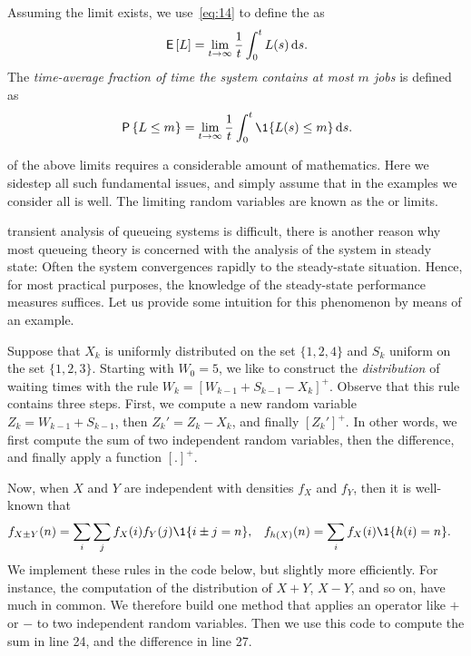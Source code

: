 Assuming the limit exists, we use~\cref{eq:14} to define the  as
\begin{equation} \label{eq:46}
 \,\mathsf{E}\left[L\right] = \lim_{t\to\infty} \frac 1 t\int_0^t L(s) \,\textrm{d}s.
\end{equation}
 The \emph{time-average fraction of time the system contains at most $m$ jobs} is defined as
\begin{equation*}
 \P{\L\leq m} =\lim_{t\to\infty} \frac 1 t\int_0^t \1{\L(s)\leq m} \d s.
\end{equation*}

 of the above limits requires a considerable amount of mathematics.
Here we sidestep all such fundamental issues, and simply assume that in the examples we consider all is well.
The limiting random variables are known as the  or  limits.

 transient analysis of queueing systems is difficult, there is another reason why most queueing theory is concerned with the analysis of the system in steady state: Often the system convergences rapidly to the steady-state situation.
Hence, for most practical purposes, the knowledge of the steady-state performance measures suffices.
Let us provide some intuition for this phenomenon by means of an example.


Suppose that $X_k$ is uniformly distributed on the set $\{1,2,4\}$ and $S_k$ uniform on the set $\{1,2,3\}$.
Starting with $W_{0}=5$, we like to construct the \emph{distribution} of waiting times with the rule $W_{k}=[W_{k-1}+S_{k-1}-X_k]^+$.
Observe that this rule contains three steps.
First, we compute a new random variable $Z_k = W_{k-1} + S_{k-1}$, then  $Z_k' = Z_k - X_k$, and finally $[Z_k']^+$. 
In other words, we first compute the sum of two independent random variables, then the difference, and finally apply a function $[.]^+$. 

Now, when $X$ and $Y$ are independent with densities $f_X$ and $f_Y$, then it is well-known that 
\begin{align*}
f_{X\pm Y}(n) &= \sum_i \sum_j f_X(i) f_Y(j)\1{i\pm j = n}, & f_{h(X)}(n) &= \sum_{i} f_X(i)\1{h(i)=n}.
\end{align*}
We implement these rules in the code below, but slightly more efficiently.
For instance, the computation of the distribution of $X+Y$, $X-Y$, and so on, have much in common.
We therefore build one method  that applies an operator like $+$ or $-$ to two independent random variables.
Then we use this code to compute the sum in line 24, and the difference in line 27. 


